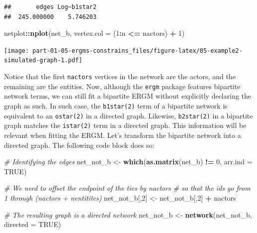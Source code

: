 \documentclass[
]{book}
\newenvironment{Shaded}{\begin{snugshade}}{\end{snugshade}}
\newcommand{\AttributeTok}[1]{\textcolor[rgb]{0.13,0.29,0.53}{#1}}
\newcommand{\CommentTok}[1]{\textcolor[rgb]{0.56,0.35,0.01}{\textit{#1}}}
\newcommand{\ConstantTok}[1]{\textcolor[rgb]{0.56,0.35,0.01}{#1}}
\newcommand{\DecValTok}[1]{\textcolor[rgb]{0.00,0.00,0.81}{#1}}
\newcommand{\FunctionTok}[1]{\textcolor[rgb]{0.13,0.29,0.53}{\textbf{#1}}}
\newcommand{\NormalTok}[1]{#1}
\newcommand{\OtherTok}[1]{\textcolor[rgb]{0.56,0.35,0.01}{#1}}
\newcommand{\SpecialCharTok}[1]{\textcolor[rgb]{0.81,0.36,0.00}{\textbf{#1}}}
\begin{document}
\begin{verbatim}
##       edges Log~b1star2 
##  245.000000    5.746203
\end{verbatim}

\begin{Shaded}
\begin{Highlighting}[]
\NormalTok{netplot}\SpecialCharTok{::}\FunctionTok{nplot}\NormalTok{(net\_b, }\AttributeTok{vertex.col =}\NormalTok{ (}\DecValTok{1}\SpecialCharTok{:}\NormalTok{n }\SpecialCharTok{\textless{}=}\NormalTok{ nactors) }\SpecialCharTok{+} \DecValTok{1}\NormalTok{)}
\end{Highlighting}
\end{Shaded}

\texttt{[image: part-01-05-ergms-constrains\_files/figure-latex/05-example2-simulated-graph-1.pdf]}

Notice that the first \texttt{nactors} vertices in the network are the actors, and the remaining are the entities. Now, although the \texttt{ergm} package features bipartite network terms, we can still fit a bipartite ERGM without explicitly declaring the graph as such. In such case, the \texttt{b1star(2)} term of a bipartite network is equivalent to an \texttt{ostar(2)} in a directed graph. Likewise, \texttt{b2star(2)} in a bipartite graph matches the \texttt{istar(2)} term in a directed graph. This information will be relevant when fitting the ERGM. Let's transform the bipartite network into a directed graph. The following code block does so:

\begin{Shaded}
\begin{Highlighting}[]
\CommentTok{\# Identifying the edges}
\NormalTok{net\_not\_b }\OtherTok{\textless{}{-}} \FunctionTok{which}\NormalTok{(}\FunctionTok{as.matrix}\NormalTok{(net\_b) }\SpecialCharTok{!=} \DecValTok{0}\NormalTok{, }\AttributeTok{arr.ind =} \ConstantTok{TRUE}\NormalTok{)}

\CommentTok{\# We need to offset the endpoint of the ties by nactors}
\CommentTok{\# so that the ids go from 1 through (nactors + nentitites)}
\NormalTok{net\_not\_b[,}\DecValTok{2}\NormalTok{] }\OtherTok{\textless{}{-}}\NormalTok{ net\_not\_b[,}\DecValTok{2}\NormalTok{] }\SpecialCharTok{+}\NormalTok{ nactors}

\CommentTok{\# The resulting graph is a directed network}
\NormalTok{net\_not\_b }\OtherTok{\textless{}{-}} \FunctionTok{network}\NormalTok{(net\_not\_b, }\AttributeTok{directed =} \ConstantTok{TRUE}\NormalTok{)}
\end{Highlighting}
\end{Shaded}
\end{document}
